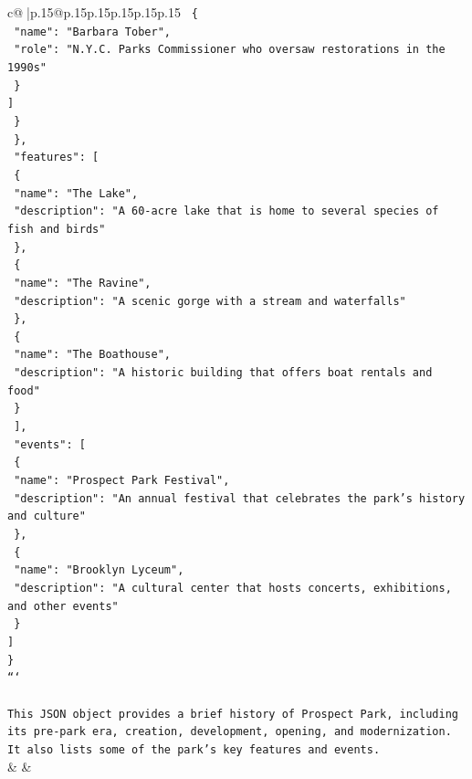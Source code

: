\documentclass{article}
\begin{document}
{\begin{supertabular}{c@{$\;$}|p{.15\linewidth}@{}p{.15\linewidth}p{.15\linewidth}p{.15\linewidth}p{.15\linewidth}p{.15\linewidth}}
{{{\texttt{        \{} \\
\texttt{          "name": "Barbara Tober",} \\
\texttt{          "role": "N.Y.C. Parks Commissioner who oversaw restorations in the 1990s"} \\
\texttt{        \}} \\
\texttt{      {]}} \\
\texttt{    \}} \\
\texttt{  \},} \\
\texttt{  "features": {[}} \\
\texttt{    \{} \\
\texttt{      "name": "The Lake",} \\
\texttt{      "description": "A 60{-}acre lake that is home to several species of fish and birds"} \\
\texttt{    \},} \\
\texttt{    \{} \\
\texttt{      "name": "The Ravine",} \\
\texttt{      "description": "A scenic gorge with a stream and waterfalls"} \\
\texttt{    \},} \\
\texttt{    \{} \\
\texttt{      "name": "The Boathouse",} \\
\texttt{      "description": "A historic building that offers boat rentals and food"} \\
\texttt{    \}} \\
\texttt{  {]},} \\
\texttt{  "events": {[}} \\
\texttt{    \{} \\
\texttt{      "name": "Prospect Park Festival",} \\
\texttt{      "description": "An annual festival that celebrates the park's history and culture"} \\
\texttt{    \},} \\
\texttt{    \{} \\
\texttt{      "name": "Brooklyn Lyceum",} \\
\texttt{      "description": "A cultural center that hosts concerts, exhibitions, and other events"} \\
\texttt{    \}} \\
\texttt{  {]}} \\
\texttt{\}} \\
\texttt{```} \\
\\ 
\texttt{This JSON object provides a brief history of Prospect Park, including its pre{-}park era, creation, development, opening, and modernization. It also lists some of the park's key features and events.} \\
            }
        }
    }
    & & \\ \\


\end{supertabular}}
\end{document}
